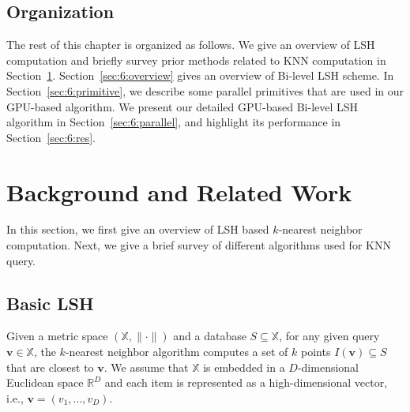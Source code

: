 \subsection{Organization}
The rest of this chapter is organized as follows. We give an overview of LSH computation and briefly survey prior methods related to KNN computation in Section~\ref{sec:6:related}. Section~\ref{sec:6:overview}
gives an overview of Bi-level LSH scheme. In Section~\ref{sec:6:primitive}, we describe some parallel primitives that are used in our GPU-based algorithm. We present our detailed GPU-based Bi-level LSH algorithm in Section~\ref{sec:6:parallel}, and highlight its performance in Section~\ref{sec:6:res}.

\section{Background and Related Work}
\label{sec:6:related}

In this section, we first give an overview of LSH based $k$-nearest neighbor computation. Next, we give a brief survey of different algorithms used for KNN query.

\subsection{Basic LSH}
\label{sec:6:related:basic}
Given a metric space $(\mathbb X, \|\cdot\|)$ and a database $S \subseteq \mathbb X$, for any given query $\mathbf v \in \mathbb X$, the $k$-nearest neighbor algorithm computes a set of $k$ points $I(\mathbf v) \subseteq S$ that are closest to $\mathbf v$. We assume that $\mathbb X$ is embedded in a $D$-dimensional Euclidean space $\mathbb{R}^D$ and each item is represented as a high-dimensional vector, i.e., $\mathbf v = (v_1, ..., v_D)$.

